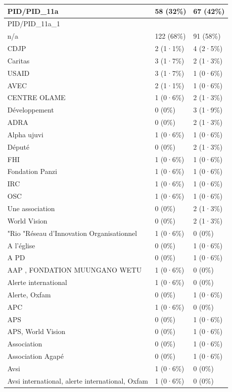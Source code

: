 \documentclass[
]{book}
\begin{document}
\begin{tabular}{l|l|l}
\hline
PID/PID\_11a & 58 (32\%) & 67 (42\%)\\
\hline
PID/PID\_11a\_1 &  & \\
\hline
n/a & 122 (68\%) & 91 (58\%)\\
\hline
CDJP & 2 (1·1\%) & 4 (2·5\%)\\
\hline
Caritas & 3 (1·7\%) & 2 (1·3\%)\\
\hline
USAID & 3 (1·7\%) & 1 (0·6\%)\\
\hline
AVEC & 2 (1·1\%) & 1 (0·6\%)\\
\hline
CENTRE OLAME & 1 (0·6\%) & 2 (1·3\%)\\
\hline
Développement & 0 (0\%) & 3 (1·9\%)\\
\hline
ADRA & 0 (0\%) & 2 (1·3\%)\\
\hline
Alpha ujuvi & 1 (0·6\%) & 1 (0·6\%)\\
\hline
Député & 0 (0\%) & 2 (1·3\%)\\
\hline
FHI & 1 (0·6\%) & 1 (0·6\%)\\
\hline
Fondation Panzi & 1 (0·6\%) & 1 (0·6\%)\\
\hline
IRC & 1 (0·6\%) & 1 (0·6\%)\\
\hline
OSC & 1 (0·6\%) & 1 (0·6\%)\\
\hline
Une association & 0 (0\%) & 2 (1·3\%)\\
\hline
World Vision & 0 (0\%) & 2 (1·3\%)\\
\hline
"Rio "Réseau d'Innovation Organisationnel & 1 (0·6\%) & 0 (0\%)\\
\hline
A l'église & 0 (0\%) & 1 (0·6\%)\\
\hline
A PD & 0 (0\%) & 1 (0·6\%)\\
\hline
AAP , FONDATION MUUNGANO WETU & 1 (0·6\%) & 0 (0\%)\\
\hline
Alerte international & 1 (0·6\%) & 0 (0\%)\\
\hline
Alerte, Oxfam & 0 (0\%) & 1 (0·6\%)\\
\hline
APC & 1 (0·6\%) & 0 (0\%)\\
\hline
APS & 0 (0\%) & 1 (0·6\%)\\
\hline
APS, World Vision & 0 (0\%) & 1 (0·6\%)\\
\hline
Association & 0 (0\%) & 1 (0·6\%)\\
\hline
Association Agapé & 0 (0\%) & 1 (0·6\%)\\
\hline
Avsi & 1 (0·6\%) & 0 (0\%)\\
\hline
Avsi international, alerte international, Oxfam & 1 (0·6\%) & 0 (0\%)\\

\end{tabular}
\end{document}
